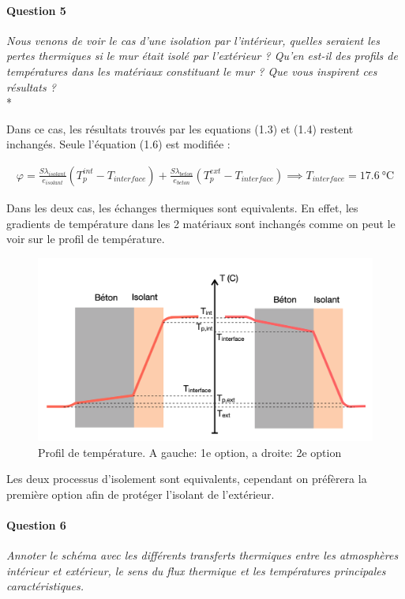 \documentclass[oneside,a4paper,13pt]{book}
\begin{document}
\paragraph{Question 5} 
\textit{Nous venons de voir le cas d’une isolation par l’intérieur, quelles seraient les pertes thermiques si le mur était isolé par l’extérieur ? Qu’en est-il des profils de températures dans les matériaux constituant le mur ? Que vous inspirent ces résultats ?} \\*

Dans ce cas, les résultats trouvés par les equations (1.3) et (1.4) restent inchangés. Seule l'équation (1.6) est modifiée  :

\begin{gather}
	\varphi = \frac{S \lambda_{isolant}}{e_{isolant}} (T_{p}^{int} - T_{interface}) + \frac{S \lambda_{beton}}{e_{beton}} (T_{p}^{ext} - T_{interface}) \implies T_{interface} = \SI{17.6}{\celsius}
\end{gather}

Dans les deux cas, les échanges thermiques sont equivalents. En effet, les gradients de température dans les 2 matériaux sont inchangés comme on peut le voir sur le profil de température.

\begin{figure}[h!]
\centering
  \includegraphics[width=0.9\linewidth]{q5.png}
  \caption{Profil de température. A gauche: 1e option, a droite: 2e option}
  \label{fig:q5}
\end{figure}

Les deux processus d'isolement sont equivalents, cependant on préfèrera la première option afin de protéger l'isolant de l'extérieur.

\newpage

\paragraph{Question 6} 
\textit{Annoter le schéma avec les différents transferts thermiques entre les atmosphères intérieur et extérieur, le sens du flux thermique et les températures principales caractéristiques.} 
\end{document}
